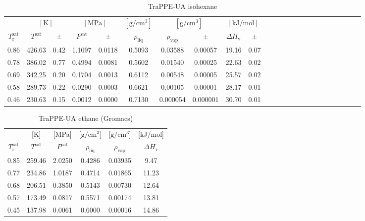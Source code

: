 \documentclass[%
 aip,
 jcp,
 sd,%
 amsmath,amssymb,
]{revtex4-1}
\begin{document}
\begin{table*}[]
\centering
\caption{
TraPPE-UA isohexane
}
\label{tab:TraPPE-iC6-trappegc}
\begin{ruledtabular}
\begin{tabular}{cccccccccccccccccccccccc}
 & \multicolumn{2}{c}{$[\mathrm{K}]$} &	 \multicolumn{2}{c}{$[\mathrm{MPa}]$} & $[\mathrm{g/cm^3}]$ & \multicolumn{2}{c}{$[\mathrm{g/cm^3}]$} & \multicolumn{2}{c}{$[\mathrm{kJ/mol}]$} \\
$T_\mathrm{r}^{\mathrm{sat}}$ & $T^{\mathrm{sat}}$ & $\pm$ & $P^{\mathrm{sat}}$ & $\pm$ & $\rho_{\mathrm{liq}}$ & $\rho_{\mathrm{vap}}$ & $\pm$ & $\Delta H_{\mathrm{v}}$ & $\pm$
 \\
\hline		
0.86	&	426.63	&	0.42	&	1.1097	&	0.0118	&	0.5093	&	0.03588	&	0.00057	&	19.16	&	0.07	\\
0.78	&	386.02	&	0.77	&	0.4994	&	0.0081	&	0.5602	&	0.01540	&	0.00025	&	22.63	&	0.02	\\
0.69	&	342.25	&	0.20	&	0.1704	&	0.0013	&	0.6112	&	0.00548	&	0.00005	&	25.57	&	0.02	\\
0.58	&	289.73	&	0.22	&	0.0290	&	0.0003	&	0.6621	&	0.00105	&	0.00001	&	28.17	&	0.01	\\
0.46	&	230.63	&	0.15	&	0.0012	&	0.0000	&	0.7130	&	0.000054	&	0.000001	&	30.70	&	0.01	\\
\end{tabular}
\end{ruledtabular}
\end{table*}

\begin{table*}[!htbp]
\centering
\caption{
TraPPE-UA ethane (Gromacs)
}
\label{tab:TraPPE-C2-trappe-gmx}
\begin{ruledtabular}
\begin{tabular}{cccccc}
 & {[}K{]} &	 {[}MPa{]} & {[}$\mathrm{g/cm^3}${]} & {[}$\mathrm{g/cm^3}${]}	& {[}kJ/mol{]}  \\
$T_\mathrm{r}^{\mathrm{sat}}$ & $T^{\mathrm{sat}}$ & $P^{\mathrm{sat}}$ & $\rho_{\mathrm{liq}}$ & $\rho_{\mathrm{vap}}$ & $\Delta H_{\mathrm{v}}$ \\
\hline													
0.85	&	259.46	&	2.0250	&	0.4286	&	0.03935	&	9.47	\\
0.77	&	234.86	&	1.0187	&	0.4714	&	0.01865	&	11.23	\\
0.68	&	206.51	&	0.3850	&	0.5143	&	0.00730	&	12.64	\\
0.57	&	173.49	&	0.0817	&	0.5571	&	0.00174	&	13.81	\\
0.45	&	137.98	&	0.0061	&	0.6000	&	0.00016	&	14.86	\\
\end{tabular}
\end{ruledtabular}
\end{table*}
\end{document}
